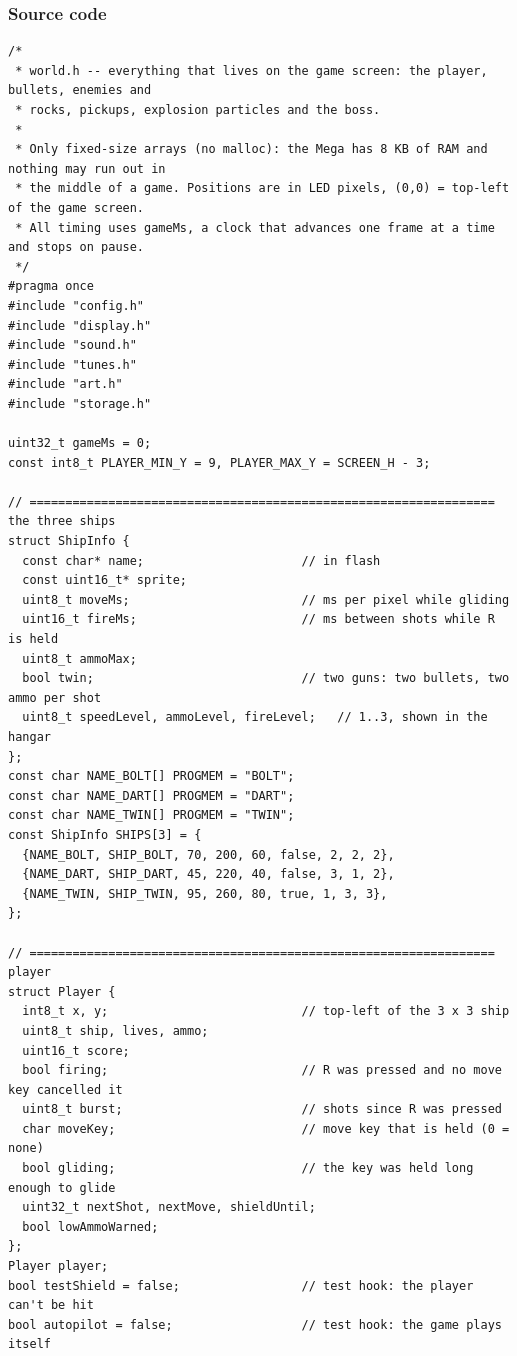 \documentclass[11pt,a4paper]{article}
\begin{document}
\subsubsection*{Source code}
\begin{lstlisting}[language=Arduino]
/*
 * world.h -- everything that lives on the game screen: the player, bullets, enemies and
 * rocks, pickups, explosion particles and the boss.
 *
 * Only fixed-size arrays (no malloc): the Mega has 8 KB of RAM and nothing may run out in
 * the middle of a game. Positions are in LED pixels, (0,0) = top-left of the game screen.
 * All timing uses gameMs, a clock that advances one frame at a time and stops on pause.
 */
#pragma once
#include "config.h"
#include "display.h"
#include "sound.h"
#include "tunes.h"
#include "art.h"
#include "storage.h"

uint32_t gameMs = 0;
const int8_t PLAYER_MIN_Y = 9, PLAYER_MAX_Y = SCREEN_H - 3;

// ================================================================= the three ships
struct ShipInfo {
  const char* name;                      // in flash
  const uint16_t* sprite;
  uint8_t moveMs;                        // ms per pixel while gliding
  uint16_t fireMs;                       // ms between shots while R is held
  uint8_t ammoMax;
  bool twin;                             // two guns: two bullets, two ammo per shot
  uint8_t speedLevel, ammoLevel, fireLevel;   // 1..3, shown in the hangar
};
const char NAME_BOLT[] PROGMEM = "BOLT";
const char NAME_DART[] PROGMEM = "DART";
const char NAME_TWIN[] PROGMEM = "TWIN";
const ShipInfo SHIPS[3] = {
  {NAME_BOLT, SHIP_BOLT, 70, 200, 60, false, 2, 2, 2},
  {NAME_DART, SHIP_DART, 45, 220, 40, false, 3, 1, 2},
  {NAME_TWIN, SHIP_TWIN, 95, 260, 80, true, 1, 3, 3},
};

// ================================================================= player
struct Player {
  int8_t x, y;                           // top-left of the 3 x 3 ship
  uint8_t ship, lives, ammo;
  uint16_t score;
  bool firing;                           // R was pressed and no move key cancelled it
  uint8_t burst;                         // shots since R was pressed
  char moveKey;                          // move key that is held (0 = none)
  bool gliding;                          // the key was held long enough to glide
  uint32_t nextShot, nextMove, shieldUntil;
  bool lowAmmoWarned;
};
Player player;
bool testShield = false;                 // test hook: the player can't be hit
bool autopilot = false;                  // test hook: the game plays itself


\end{lstlisting}
\end{document}
